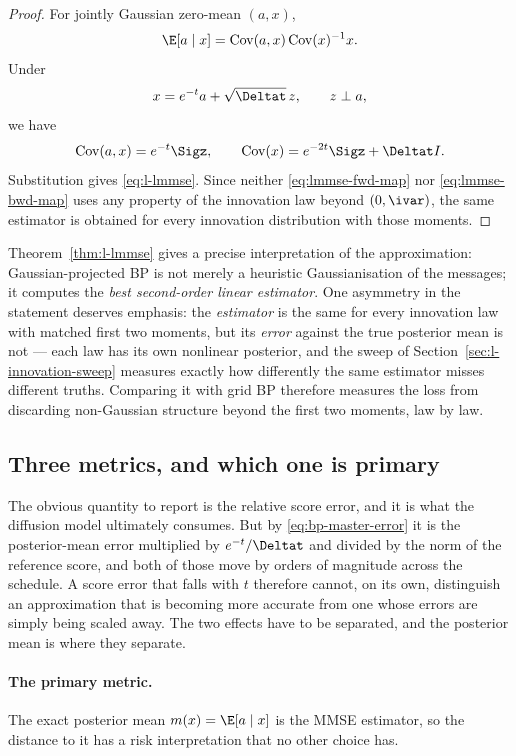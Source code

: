 \begin{proof}
For jointly Gaussian zero-mean $(a,x)$,
\[
  \E[a\mid x]
  =
  \operatorname{Cov}(a,x)\operatorname{Cov}(x)^{-1}x.
\]
Under
\[
  x=e^{-t}a+\sqrt{\Deltat}\,z,
  \qquad z\perp a,
\]
we have
\begin{equation}
  \operatorname{Cov}(a,x)=e^{-t}\Sigz,
  \qquad
  \operatorname{Cov}(x)=e^{-2t}\Sigz+\Deltat I .
  \label{eq:lmmse-covs}
\end{equation}
Substitution gives \eqref{eq:l-lmmse}. Since neither
\eqref{eq:lmmse-fwd-map} nor \eqref{eq:lmmse-bwd-map} uses any property of
the innovation law beyond $(0,\ivar)$, the same estimator is obtained for
every innovation distribution with those moments.
\end{proof}

Theorem~\ref{thm:l-lmmse} gives a precise interpretation of the approximation:
Gaussian-projected BP is not merely a heuristic Gaussianisation of the
messages; it computes the \emph{best second-order linear estimator}. One
asymmetry in the statement deserves emphasis: the \emph{estimator} is the
same for every innovation law with matched first two moments, but its
\emph{error} against the true posterior mean is not --- each law has its own
nonlinear posterior, and the sweep of Section~\ref{sec:l-innovation-sweep}
measures exactly how differently the same estimator misses different truths.
Comparing it with grid BP therefore measures the loss from discarding
non-Gaussian structure beyond the first two moments, law by law.

\subsection{Three metrics, and which one is primary}
\label{sec:l-metrics}

The obvious quantity to report is the relative score error, and it is what the
diffusion model ultimately consumes. But by \eqref{eq:bp-master-error} it is
the posterior-mean error multiplied by $e^{-t}/\Deltat$ and divided by the norm
of the reference score, and both of those move by orders of magnitude across
the schedule. A score error that falls with $t$ therefore cannot, on its own,
distinguish an approximation that is becoming more accurate from one whose
errors are simply being scaled away. The two effects have to be separated, and
the posterior mean is where they separate.

\paragraph{The primary metric.} The exact posterior mean $m(x) = \E[a \mid x]$
is the MMSE estimator, so the distance to it has a risk interpretation that no
other choice has.

